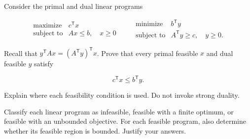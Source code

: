 \documentclass[11  pt]{exam}
\begin{document}
\begin{questions}
\begin{parts}
		\end{parts}



		\question Consider the primal and dual linear programs

		\[\begin{array}{ll}
				\text{maximize} & c^{\mathsf T}x\\
				\text{subject to} & Ax\le b,\quad x\ge 0
			\end{array}
			\qquad
			\begin{array}{ll}
				\text{minimize} & b^{\mathsf T}y\\
				\text{subject to} & A^{\mathsf T}y\ge c,\quad y\ge 0.
			\end{array}
		\]

		Recall that $y^{\mathsf T}Ax=(A^{\mathsf T}y)^{\mathsf T}x$. Prove that every primal feasible $x$ and dual feasible $y$ satisfy

		\[c^{\mathsf T}x\le b^{\mathsf T}y.\]

		Explain where each feasibility condition is used. Do not invoke strong duality.



		\question Classify each linear program as infeasible, feasible with a finite optimum, or feasible with an unbounded objective. For each feasible program, also determine whether its feasible region is bounded. Justify your answers.

\end{questions}
\end{document}
